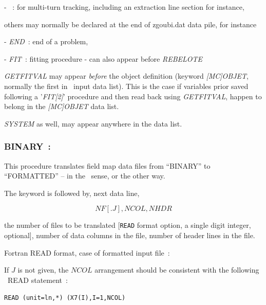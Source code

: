 - \REBELOTE{}~: for    multi-turn tracking, 
including  an extraction line section for instance, 

\medskip

\noindent others may  normally be declared at the end of zgoubi.dat  data pile, for instance

- \textsl{END}~:  end of a problem, 

- \textsl{FIT}~: fitting procedure - can also appear before \textsl{REBELOTE}


\medskip

\noindent \textsl{GETFITVAL} may appear 
\textsl{before} the object definition (keyword \textsl{[MC]OBJET}, normally the first in \zgou\ input data list). This is 
the case if  variables prior saved following a '\textsl{FIT[2]}' procedure 
and then read back using \textsl{GETFITVAL}, happen to belong in the \textsl{[MC]OBJET} data list. 

\medskip

\noindent \textsl{SYSTEM} as well,  may appear anywhere in the data list.



\newpage

\subsubsection{BINARY~: \BINARYTitl}  \label{BINARY} 
\medskip

This procedure translates field map data files from ``BINARY'' to 
``FORMATTED'' -- in the \FORTRAN\ sense, or the other way.

\bigskip

\noindent The keyword is followed by, next data line,  

$$NF[.J], NCOL, NHDR $$

\noindent  the number of files to be translated [\texttt{READ} format option, a single digit integer, optional],  
number of data columns in the file, 
number of header lines in the file.  

\bigskip

\noindent Fortran READ format, case of formatted input file~: 

\smallskip

 If $J$ is not given, the $NCOL$ arrangement should be consistent with the following \FORTRAN\ READ statement~: 

       {\tt     READ (unit=ln,*) (X7(I),I=1,NCOL)}

